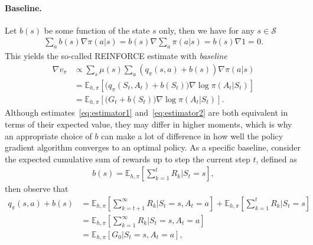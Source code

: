 \documentclass[a4paper]{report}
\theoremstyle{definition}
\theoremstyle{plain}
\begin{document}
\paragraph{Baseline.}
Let $b(s)$ be some function of the state $s$ only, then we have for any $s \in \mathcal{S}$
\begin{align}
  \sum_{a} b(s) \nabla \pi(a | s) = b(s) \nabla \sum_{a} \pi(a | s) = b(s) \nabla 1 = 0 .
\end{align}
This yields the so-called REINFORCE estimate with \textit{baseline}
\begin{subequations}
\begin{align}
  \nabla v_{\pi} &\propto \sum_{s} \mu(s) \sum_{a} (q_{\pi}(s, a) + b(s)) \nabla \pi(a | s) \\
          &= \mathbb{E}_{h, \pi} \left[ \bigl(q_{\pi}(S_{t}, A_{t}) + b(S_{t}) \bigr) \nabla \log \pi(A_{t} | S_{t}) \right] \\
  &= \mathbb{E}_{h, \pi} \left[ \bigl(G_{t} + b(S_{t}) \bigr) \nabla \log \pi(A_{t} | S_{t}) \right] .
  \label{eq:estimator2}
\end{align}
\end{subequations}
%
Although estimates~\eqref{eq:estimator1} and~\eqref{eq:estimator2} are both equivalent in terms of their expected
value, they may differ in higher moments, which is why an appropriate choice of
$b$ can make a lot of difference in how well the policy gradient algorithm
converges to an optimal policy.
%
As a specific baseline, consider the expected cumulative sum of rewards up to
step the current step $t$, defined as
\begin{align}
  b(s) = \mathbb{E}_{h,\pi} \left[ \sum_{k=1}^{t} R_{k} \Big| S_{t} = s \right],
\end{align}
then observe that
\begin{subequations}
\begin{align}
  q_{\pi}(s, a) + b(s) &= \mathbb{E}_{h,\pi}\left[ \sum_{k=t+1}^{\infty} R_{k} \Big| S_{t} = s , A_{t} = a \right] + \mathbb{E}_{h,\pi}\left[ \sum_{k=1}^{t} R_{k} \Big| S_{t} = s \right] \\
                     &= \mathbb{E}_{h,\pi}\left[ \sum_{k=1}^{\infty}  R_{k} \Big| S_{t} = s, A_{t} = a \right] \\
                     &= \mathbb{E}_{h,\pi} [ G_{0} | S_{t} = s, A_{t} = a ] ,
\end{align}
\end{subequations}
\end{document}
